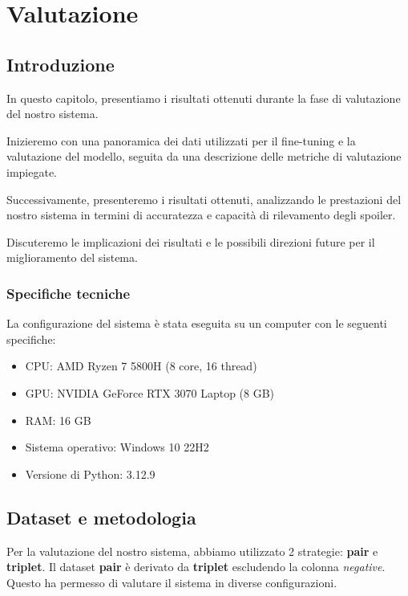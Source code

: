 \chapter{Valutazione}
\label{ch:valutazione}

\section{Introduzione}
\label{sec:introduzione}
In questo capitolo, presentiamo i risultati ottenuti
durante la fase di valutazione del nostro sistema.

Inizieremo con una panoramica dei dati utilizzati per il
fine-tuning e la valutazione del modello, seguita da una
descrizione delle metriche di valutazione impiegate.

Successivamente, presenteremo i risultati ottenuti,
analizzando le prestazioni del nostro sistema in termini di
accuratezza e capacità di rilevamento degli spoiler.

Discuteremo le implicazioni dei risultati e le possibili
direzioni future per il miglioramento del sistema.

\subsection{Specifiche tecniche}
\label{sec:specs}
La configurazione del sistema è stata eseguita su un
computer con le seguenti specifiche:

\begin{itemize}
  \item CPU: AMD Ryzen 7 5800H (8 core, 16 thread)
  \item GPU: NVIDIA GeForce RTX 3070 Laptop (8 GB)
  \item RAM: 16 GB
  \item Sistema operativo: Windows 10 22H2
  \item Versione di Python: 3.12.9
\end{itemize}

\section{Dataset e metodologia}
\label{sec:dataset_eval}

Per la valutazione del nostro sistema, abbiamo utilizzato 2
strategie: \textbf{pair} e \textbf{triplet}.
Il dataset \textbf{pair} è derivato da \textbf{triplet}
escludendo la colonna \textit{negative}.
Questo ha permesso di valutare il sistema in diverse
configurazioni.

